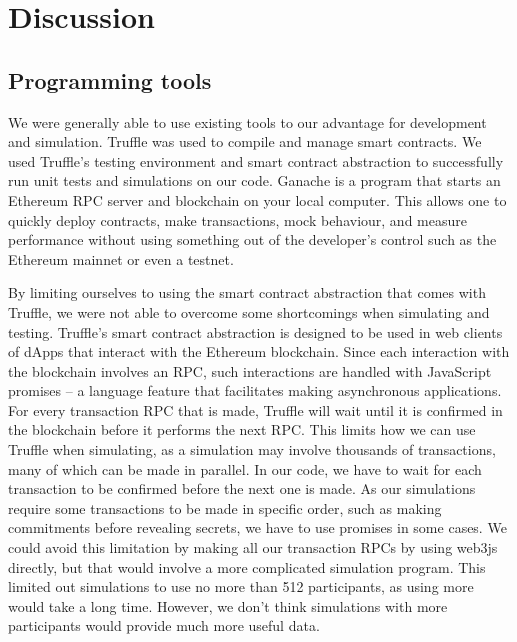 \chapter{Discussion}
\label{chap:discussion}


\section{Programming tools}
\label{sec:tools}

We were generally able to use existing tools to our advantage for development and simulation. Truffle was used to compile and manage smart contracts. We used Truffle's testing environment and smart contract abstraction to successfully run unit tests and simulations on our code. Ganache is a program that starts an Ethereum RPC server and blockchain on your local computer. This allows one to quickly deploy contracts, make transactions, mock behaviour, and measure performance without using something out of the developer's control such as the Ethereum mainnet or even a testnet.

By limiting ourselves to using the smart contract abstraction that comes with Truffle, we were not able to overcome some shortcomings when simulating and testing. Truffle's smart contract abstraction is designed to be used in web clients of dApps that interact with the Ethereum blockchain. Since each interaction with the blockchain involves an RPC, such interactions are handled with JavaScript promises – a language feature that facilitates making asynchronous applications. For every transaction RPC that is made, Truffle will wait until it is confirmed in the blockchain before it performs the next RPC. This limits how we can use Truffle when simulating, as a simulation may involve thousands of transactions, many of which can be made in parallel. In our code, we have to wait for each transaction to be confirmed before the next one is made. As our simulations require some transactions to be made in specific order, such as making commitments before revealing secrets, we have to use promises in some cases. We could avoid this limitation by making all our transaction RPCs by using web3js directly, but that would involve a more complicated simulation program. This limited out simulations to use no more than 512 participants, as using more would take a long time. However, we don't think simulations with more participants would provide much more useful data.


